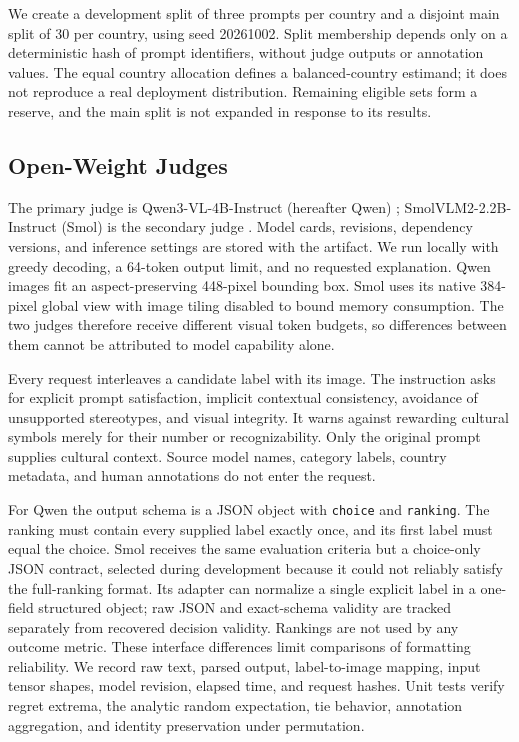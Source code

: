 \documentclass[letterpaper]{article}
\begin{document}


We create a development split of three prompts per country and a disjoint main split of 30 per country, using seed 20261002. Split membership depends only on a deterministic hash of prompt identifiers, without judge outputs or annotation values. The equal country allocation defines a balanced-country estimand; it does not reproduce a real deployment distribution. Remaining eligible sets form a reserve, and the main split is not expanded in response to its results.

\subsection{Open-Weight Judges}
The primary judge is Qwen3-VL-4B-Instruct (hereafter Qwen) \citep{qwenmodel}; SmolVLM2-2.2B-Instruct (Smol) is the secondary judge \citep{smolvlm,smolmodel}. Model cards, revisions, dependency versions, and inference settings are stored with the artifact. We run locally with greedy decoding, a 64-token output limit, and no requested explanation. Qwen images fit an aspect-preserving 448-pixel bounding box. Smol uses its native 384-pixel global view with image tiling disabled to bound memory consumption. The two judges therefore receive different visual token budgets, so differences between them cannot be attributed to model capability alone.

Every request interleaves a candidate label with its image. The instruction asks for explicit prompt satisfaction, implicit contextual consistency, avoidance of unsupported stereotypes, and visual integrity. It warns against rewarding cultural symbols merely for their number or recognizability. Only the original prompt supplies cultural context. Source model names, category labels, country metadata, and human annotations do not enter the request.

For Qwen the output schema is a JSON object with \texttt{choice} and \texttt{ranking}. The ranking must contain every supplied label exactly once, and its first label must equal the choice. Smol receives the same evaluation criteria but a choice-only JSON contract, selected during development because it could not reliably satisfy the full-ranking format. Its adapter can normalize a single explicit label in a one-field structured object; raw JSON and exact-schema validity are tracked separately from recovered decision validity. Rankings are not used by any outcome metric. These interface differences limit comparisons of formatting reliability. We record raw text, parsed output, label-to-image mapping, input tensor shapes, model revision, elapsed time, and request hashes. Unit tests verify regret extrema, the analytic random expectation, tie behavior, annotation aggregation, and identity preservation under permutation.
\end{document}

